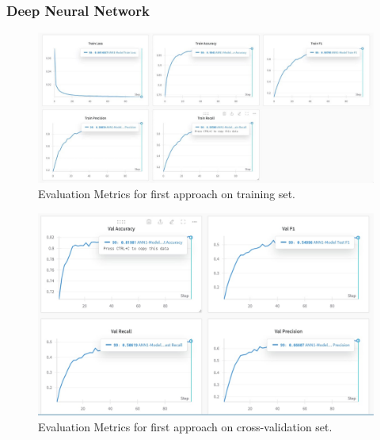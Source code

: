 \documentclass{article}
\begin{document}
\subsubsection{Deep Neural Network}
\begin{figure}[h!]
  \centering
  \includegraphics[width=\textwidth]{DNN_TRAIN.jpeg} 
  \caption{Evaluation Metrics for first approach on training set.}
  \label{fig:your-label}
\end{figure}
\begin{figure}[h!]
  \centering
  \includegraphics[width=\textwidth]{DNN_VAL.jpeg} 
  \caption{Evaluation Metrics for first approach on cross-validation set.}
  \label{fig:your-label}
\end{figure}

\FloatBarrier
\end{document}
